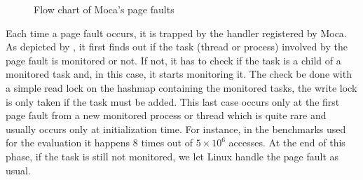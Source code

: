 
\begin{figure}[htb]
    \centering
    
    \caption{Flow chart of Moca's page faults}
    \label{fig:fpf-flow}
\end{figure}

Each time a page fault occurs, it is trapped by the handler registered by \gls{Moca}.
As depicted by , it first finds out if the task (thread or process) involved by the page fault is monitored or not.
If not, it has to check if the task is a child of a monitored task and, in this case, it starts monitoring it.
The check be done with a simple read lock on the hashmap containing the monitored tasks, the write lock is only taken if the task must be added.
This last case occurs only at the first page fault from a new monitored process or thread which is quite rare and usually occurs only at initialization time.
For instance, in the benchmarks used for the evaluation it happens $8$ times out of $5\times10^6$ accesses.
At the end of this phase, if the task is still not monitored, we let Linux handle the page fault as usual.

